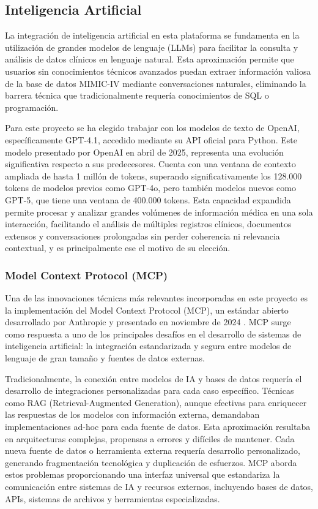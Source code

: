\newpage
\subsection{Inteligencia Artificial}

La integración de inteligencia artificial en esta plataforma se fundamenta en la utilización de grandes modelos de lenguaje (LLMs) para facilitar la consulta y análisis de datos clínicos en lenguaje natural. Esta aproximación permite que usuarios sin conocimientos técnicos avanzados puedan extraer información valiosa de la base de datos MIMIC-IV mediante conversaciones naturales, eliminando la barrera técnica que tradicionalmente requería conocimientos de SQL o programación.

Para este proyecto se ha elegido trabajar con los modelos de texto de OpenAI, específicamente GPT-4.1, accedido mediante su API oficial para Python. Este modelo presentado por OpenAI en abril de 2025, representa una evolución significativa respecto a sus predecesores. Cuenta con una ventana de contexto ampliada de hasta 1 millón de tokens, superando significativamente los 128.000 tokens de modelos previos como GPT-4o, pero también modelos nuevos como GPT-5, que tiene una ventana de 400.000 tokens. Esta capacidad expandida permite procesar y analizar grandes volúmenes de información médica en una sola interacción, facilitando el análisis de múltiples registros clínicos, documentos extensos y conversaciones prolongadas sin perder coherencia ni relevancia contextual, y es principalmente ese el motivo de su elección.

\subsubsection{Model Context Protocol (MCP)}

Una de las innovaciones técnicas más relevantes incorporadas en este proyecto es la implementación del Model Context Protocol (MCP), un estándar abierto desarrollado por Anthropic y presentado en noviembre de 2024 \cite{AnthropicMCP2024}. MCP surge como respuesta a uno de los principales desafíos en el desarrollo de sistemas de inteligencia artificial: la integración estandarizada y segura entre modelos de lenguaje de gran tamaño y fuentes de datos externas.


Tradicionalmente, la conexión entre modelos de IA y bases de datos requería el desarrollo de integraciones personalizadas para cada caso específico. Técnicas como RAG (Retrieval-Augmented Generation), aunque efectivas para enriquecer las respuestas de los modelos con información externa, demandaban implementaciones ad-hoc para cada fuente de datos. Esta aproximación resultaba en arquitecturas complejas, propensas a errores y difíciles de mantener. Cada nueva fuente de datos o herramienta externa requería desarrollo personalizado, generando fragmentación tecnológica y duplicación de esfuerzos. MCP aborda estos problemas proporcionando una interfaz universal que estandariza la comunicación entre sistemas de IA y recursos externos, incluyendo bases de datos, APIs, sistemas de archivos y herramientas especializadas.

